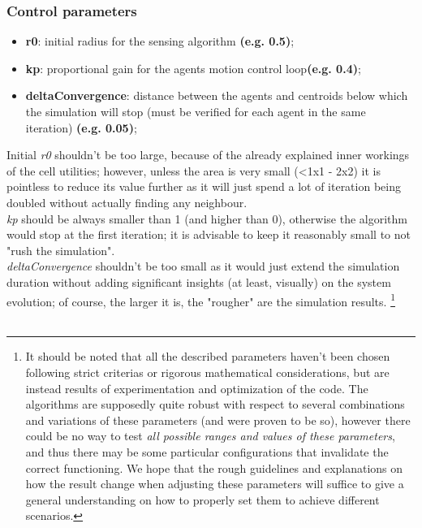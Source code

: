 \documentclass[a4paper,11pt,oneside]{book}
\begin{document}
	
	
	\subsubsection{Control parameters}
	\begin{itemize}
		\item \textbf{r0}: initial radius for the sensing algorithm \textbf{(e.g. 0.5)};
		\item \textbf{kp}: proportional gain for the agents motion control loop\textbf{(e.g. 0.4)};
		\item \textbf{deltaConvergence}: distance between the agents and centroids below which the simulation will stop (must be verified for each agent in the same iteration) \textbf{(e.g. 0.05)};
	\end{itemize}
	
	Initial \textit{r0} shouldn't be too large, because of the already explained inner workings of the cell utilities; however, unless the area is very small (\textless1x1 - 2x2) it is pointless to reduce its value further as it will just spend a lot of iteration being doubled without actually finding any neighbour.\\
	
	\textit{kp} should be always smaller than 1 (and higher than 0), otherwise the algorithm would stop at the first iteration; it is advisable to keep it reasonably small to not "rush the simulation".\\
	
	\textit{deltaConvergence} shouldn't be too small as it would just extend the simulation duration without adding significant insights (at least, visually) on the system evolution; of course, the larger it is, the "rougher" are the simulation results.
	\footnote{It should be noted that all the described parameters haven't been chosen following strict criterias or rigorous mathematical considerations, but are instead results of experimentation and optimization of the code. The algorithms are supposedly quite robust with respect to several combinations and variations of these parameters (and were proven to be so), however there could be no way to test \emph{all possible ranges and values of these parameters}, and thus there may be some particular configurations that invalidate the correct functioning. We hope that the rough guidelines and explanations on how the result change when adjusting these parameters will suffice to give a general understanding on how to properly set them to achieve different scenarios.}\\\\
	
\end{document}
